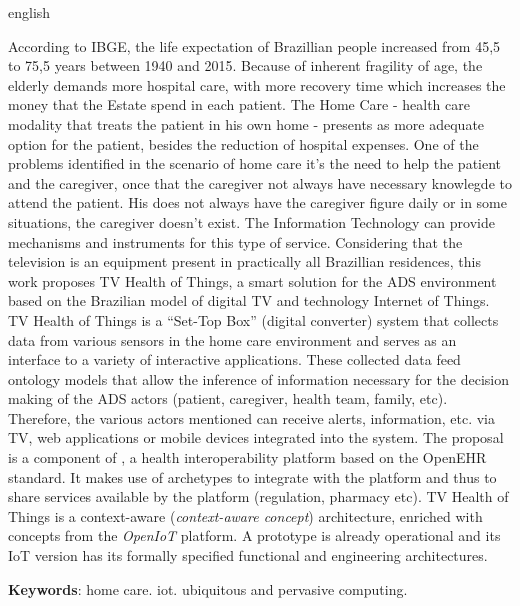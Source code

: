 \begin{resumo}[Abstract]
 \begin{otherlanguage*}{english}

According to IBGE, the life expectation of Brazillian people increased from
45,5 to 75,5 years between 1940 and 2015. Because of inherent fragility
of age, the elderly demands more hospital care, with more recovery time
which increases the money that the Estate spend in each patient. The
Home Care - health care modality that treats the patient in his own
home - presents as more adequate option for the patient, besides the
reduction of hospital expenses. One of the problems identified in the
scenario of home care it's the need to help the patient and the caregiver,
once that the caregiver not always have necessary knowlegde to attend
the patient. His does not always have the caregiver figure daily or in
some situations, the caregiver doesn't exist. The Information Technology
can provide mechanisms and instruments for this type of service.
Considering that the television is an equipment present in practically all
Brazillian residences, this work proposes TV Health of Things, a smart
solution for the ADS environment based on the Brazilian model of digital TV
and technology Internet of Things. TV Health of Things is a ``Set-Top Box''
(digital converter) system that collects data from various sensors in the
home care environment and serves as an interface to a variety of interactive
applications. These collected data feed ontology models that allow the
inference of information necessary for the decision making of the ADS actors
(patient, caregiver, health team, family, etc). Therefore, the various actors
mentioned can receive alerts, information, etc. via TV, web applications or 
mobile devices integrated into the system. The proposal is a component of 
\nextsaude[], a health interoperability platform based on the OpenEHR
standard. It makes use of archetypes to integrate with the \nextsaude[] platform
and thus to share services available by the platform (regulation, pharmacy
etc). TV Health of Things is a context-aware (\textit{context-aware concept}) 
architecture, enriched with concepts from the \textit {OpenIoT} platform. 
A prototype is already operational and its IoT version has its formally 
specified functional and engineering architectures.


\textbf{Keywords}: home care. iot. ubiquitous and pervasive computing.
 \end{otherlanguage*}
\end{resumo}
